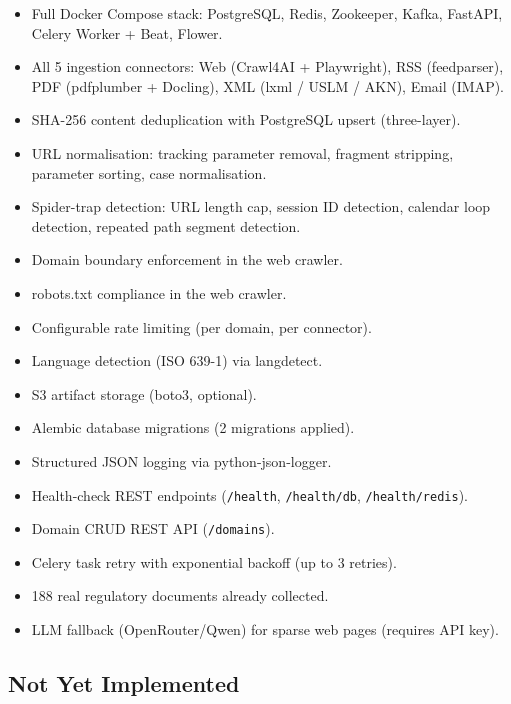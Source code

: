 \documentclass[12pt,a4paper]{article}
\begin{document}
\begin{successbox}
\begin{itemize}[noitemsep]
  \item Full Docker Compose stack: PostgreSQL, Redis, Zookeeper, Kafka, FastAPI, Celery Worker + Beat, Flower.
  \item All 5 ingestion connectors: Web (Crawl4AI + Playwright), RSS (feedparser), PDF (pdfplumber + Docling), XML (lxml / USLM / AKN), Email (IMAP).
  \item SHA-256 content deduplication with PostgreSQL upsert (three-layer).
  \item URL normalisation: tracking parameter removal, fragment stripping, parameter sorting, case normalisation.
  \item Spider-trap detection: URL length cap, session ID detection, calendar loop detection, repeated path segment detection.
  \item Domain boundary enforcement in the web crawler.
  \item robots.txt compliance in the web crawler.
  \item Configurable rate limiting (per domain, per connector).
  \item Language detection (ISO 639-1) via langdetect.
  \item S3 artifact storage (boto3, optional).
  \item Alembic database migrations (2 migrations applied).
  \item Structured JSON logging via python-json-logger.
  \item Health-check REST endpoints (\texttt{/health}, \texttt{/health/db}, \texttt{/health/redis}).
  \item Domain CRUD REST API (\texttt{/domains}).
  \item Celery task retry with exponential backoff (up to 3 retries).
  \item 188 real regulatory documents already collected.
  \item LLM fallback (OpenRouter/Qwen) for sparse web pages (requires API key).
\end{itemize}
\end{successbox}

\subsection{Not Yet Implemented}
\end{document}

